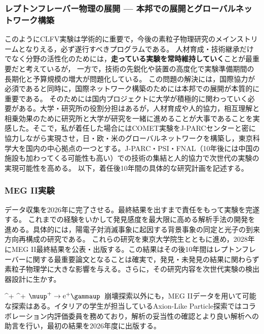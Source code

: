 \documentclass[11pt,a4paper,uplatex,dvipdfmx]{ujarticle} 		%
\newcommand{\研究課題名}{象の卵}
\newcommand{\研究機関名}{東京大学}
\newcommand{\研究代表者氏名}{内山雄祐}
\newcommand{\研究期間の最終元号年度}{6}  %
\renewcommand{\emph}[1]{{\sffamily\bfseries{#1}}}
\newcommand*{\megc}{\ifmmode\muup^+ \to \mathrm{e}^+ \gammaup\else$\muup^+ \to \mathrm{e}^+ \gammaup$\fi}
\begin{document}
\subsubsection{レプトンフレーバー物理の展開 --- 本邦での展開とグローバルネットワーク構築}
このようにCLFV実験は学術的に重要で，今後の素粒子物理研究のメインストリームとなりえる，必ず遂行すべきプログラムである。
人材育成・技術継承だけでなく分野の活性化のためには，\emph{走っている実験を常時維持していく}ことが最重要だと考えているが，
一方で，技術の先鋭化や装置の高度化で実験準備期間の長期化と予算規模の増大が問題化している。
この問題の解決には，国際協力が必須であると同時に，国際ネットワーク構築のためには本邦での展開が本質的に重要である。
そのためには国内プロジェクトに大学が積極的に関わっていく必要がある。大学・研究所の役割分担はあるが，人材育成や人的協力，相互理解と相乗効果のために研究所と大学が研究を一緒に進めることが大事であることを実感した。そこで，私が着任した場合にはCOMET実験をJ-PARCセンターと密に協力しながら実現させ，日・欧・米のグローバルネットワークを構築し，東京科学大を国内の中心拠点の一つとする。J-PARC・PSI・FNAL（10年後には中国の施設も加わってくる可能性も高い）での技術の集結と人的協力で次世代の実験の実現可能性を高める。
以下，着任後10年間の具体的な研究計画を記述する。

\subsubsection{MEG II実験}
データ収集を2026年に完了させる。最終結果を出すまで責任をもって実験を完遂する。
これまでの経験をいかして発見感度を最大限に高める解析手法の開発を進める。具体的には，陽電子対消滅事象に起因する背景事象の同定と光子の到来方向再構成の研究である。
これらの研究を東京大学院生とともに進め，2028年にMEG II最終結果を公表・出版する。この結果はその後10年間はレプトンフレーバーに関する最重要論文となることは確実で，発見・未発見の結果に関わらず素粒子物理学に大きな影響を与える。さらに，その研究内容を次世代実験の検出器設計に生かす。

\megc\ 崩壊探索以外にも，MEG IIデータを用いて可能な探索はある。イタリアの学生が担当しているAxion-Like Particle探索ではコラボレーション内評価委員を務めており，解析の妥当性の確認とより良い解析への助言を行い，最初の結果を2026年度に出版する。
\end{document}
